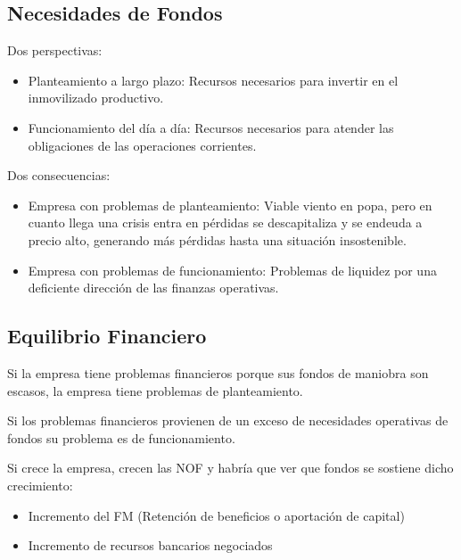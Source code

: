 \subsection{Necesidades de Fondos}
Dos perspectivas:
\begin{itemize}
    \item Planteamiento a largo plazo: Recursos necesarios para invertir en el inmovilizado productivo.
    \item Funcionamiento del día a día: Recursos necesarios para atender las obligaciones de las operaciones corrientes.
\end{itemize}

Dos consecuencias:
\begin{itemize}
    \item Empresa con problemas de planteamiento: Viable viento en popa, pero en cuanto llega una crisis entra en pérdidas se descapitaliza y se endeuda a precio alto, generando más pérdidas hasta una situación insostenible.
    \item Empresa con problemas de funcionamiento: Problemas de liquidez por una deficiente dirección de las finanzas operativas.
\end{itemize}

\subsection{Equilibrio Financiero}
Si la empresa tiene problemas financieros porque sus fondos de maniobra son escasos, la empresa tiene problemas de planteamiento. 

Si los problemas financieros provienen de un exceso de necesidades operativas de fondos su problema es de funcionamiento.

Si crece la empresa, crecen las NOF y habría que ver que fondos se sostiene dicho crecimiento:
\begin{itemize}
    \item Incremento del FM (Retención de beneficios o aportación de capital)
    \item Incremento de recursos bancarios negociados
\end{itemize}